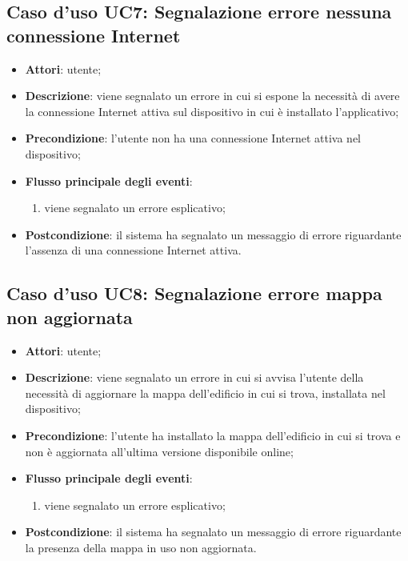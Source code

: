 \documentclass[../AnalisiDeiRequisiti.tex]{subfiles}
\begin{document}
\subsection{Caso d'uso UC7: Segnalazione errore nessuna connessione Internet}
\begin{itemize}
	\item \textbf{Attori}: utente;
	\item \textbf{Descrizione}: viene segnalato un errore in cui si espone la necessità di avere la connessione Internet attiva sul dispositivo in cui è installato l'applicativo; 
	\item \textbf{Precondizione}: l'utente non ha una connessione Internet attiva nel dispositivo;
	
	\item \textbf{Flusso principale degli eventi}:
	\begin{enumerate}
		\item viene segnalato un errore esplicativo;
		
	\end{enumerate}
	\item \textbf{Postcondizione}: il sistema ha segnalato un messaggio di errore riguardante l'assenza di una connessione Internet attiva.
\end{itemize}
\hypertarget{UC8}{}
\subsection{Caso d'uso UC8: Segnalazione errore mappa non aggiornata}
\begin{itemize}
	\item \textbf{Attori}: utente;
	\item \textbf{Descrizione}: viene segnalato un errore in cui si avvisa l'utente della necessità di aggiornare la mappa dell'edificio in cui si trova, installata nel dispositivo; 
	\item \textbf{Precondizione}: l'utente ha installato la mappa dell'edificio in cui si trova e non è aggiornata all'ultima versione disponibile online;
	
	\item \textbf{Flusso principale degli eventi}:
	\begin{enumerate}
		\item viene segnalato un errore esplicativo;
		
	\end{enumerate}
	\item \textbf{Postcondizione}: il sistema ha segnalato un messaggio di errore riguardante la presenza della mappa in uso non aggiornata.
\end{itemize}
\hypertarget{UC9}{}
\end{document}
